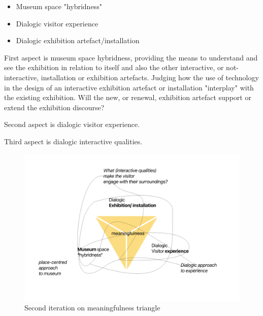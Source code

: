 \begin{itemize}
    \item Museum space "hybridness"
    \item Dialogic visitor experience
    \item Dialogic exhibition artefact/installation
\end{itemize}

First aspect is museum space hybridness, providing the means to understand and see the exhibition in relation to itself and also the other interactive, or not-interactive, installation or exhibition artefacts. Judging how the use of technology in the design of an interactive exhibition artefact or installation "interplay" with the existing exhibition. Will the new, or renewal, exhibition artefact support or extend the exhibition discourse?

Second aspect is dialogic visitor experience. 

Third aspect is dialogic interactive qualities.

\begin{figure}[H]
\centering 
\includegraphics[width=13cm]{pictures/Theory/meaningfulness_triangle.png}
\caption{Second iteration on meaningfulness triangle}
\end{figure}


